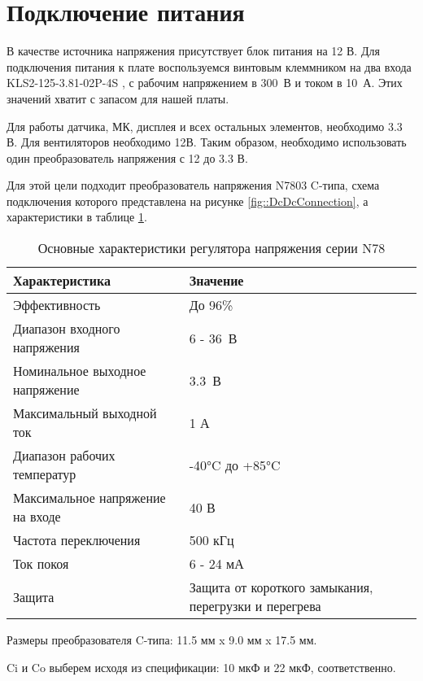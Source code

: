 \section {Подключение питания}

В качестве источника напряжения присутствует блок питания на 12 В. Для подключения питания к плате воспользуемся винтовым клеммником на два входа KLS2-125-3.81-02P-4S \cite{datasheet::DcDc}, с рабочим напряжением в 300~В и током в 10~А. Этих значений хватит с запасом для нашей платы. 

Для работы датчика, МК, дисплея и всех остальных элементов, необходимо 3.3 В. Для вентиляторов необходимо 12В. Таким образом, необходимо использовать один преобразователь напряжения с 12 до 3.3 В. 

Для этой цели подходит преобразователь напряжения N7803 C-типа, схема подключения которого представлена на рисунке \ref{fig::DcDcConnection}, а характеристики в таблице \ref{tab::DcDcConverter}.


\begin{table}[H]
	\centering
	\caption{Основные характеристики регулятора напряжения серии N78}
	\begin{tabular}{| m{6cm} | m{8cm} |}
		\hline
		\textbf{Характеристика} & \textbf{Значение} \\ \hline
		Эффективность & До 96\% \\ \hline
		Диапазон входного напряжения & 6 - 36~В \\ \hline
		Номинальное выходное напряжение & 3.3~В \\ \hline
		Максимальный выходной ток & 1 А \\ \hline
		Диапазон рабочих температур & -40°C до +85°C \\ \hline
		Максимальное напряжение на входе & 40 В \\ \hline
		Частота переключения & 500 кГц \\ \hline
		Ток покоя & 6 - 24 мА \\ \hline
		Защита & Защита от короткого замыкания, перегрузки и перегрева \\ \hline
	\end{tabular}
	\label{tab::DcDcConverter}
\end{table}

Размеры преобразователя C-типа: 11.5 мм x 9.0 мм x 17.5 мм.

Ci и Co выберем исходя из спецификации: 10 мкФ и 22 мкФ, соответственно.

